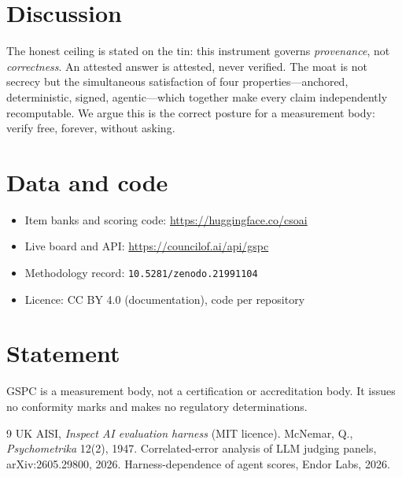 \documentclass[11pt]{article}
\begin{document}
\section{Discussion}
The honest ceiling is stated on the tin: this instrument governs
\emph{provenance}, not \emph{correctness}. An attested answer is attested,
never verified. The moat is not secrecy but the simultaneous satisfaction of
four properties---anchored, deterministic, signed, agentic---which together
make every claim independently recomputable. We argue this is the correct
posture for a measurement body: verify free, forever, without asking.

\section{Data and code}
\begin{itemize}
\item Item banks and scoring code: \url{https://huggingface.co/csoai}
\item Live board and API: \url{https://councilof.ai/api/gspc}
\item Methodology record: \texttt{10.5281/zenodo.21991104}
\item Licence: CC BY 4.0 (documentation), code per repository
\end{itemize}

\section*{Statement}
GSPC is a measurement body, not a certification or accreditation body. It
issues no conformity marks and makes no regulatory determinations.


\begin{thebibliography}{9}
 UK AISI, \emph{Inspect AI evaluation harness} (MIT licence).
 McNemar, Q., \emph{Psychometrika} 12(2), 1947.
 Correlated-error analysis of LLM judging panels, arXiv:2605.29800, 2026.
 Harness-dependence of agent scores, Endor Labs, 2026.
\end{thebibliography}
\end{document}
